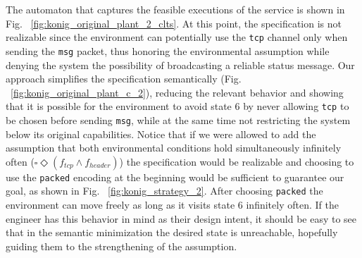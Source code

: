 The automaton that captures the feasible executions of the service is shown in Fig. ~\ref{fig:konig_original_plant_2_clts}. At this point, the specification is not realizable since the environment can potentially use the \texttt{tcp} channel only when sending the \texttt{msg} packet, thus honoring the environmental assumption while denying the system the possibility of broadcasting a reliable status message.
Our approach simplifies the specification semantically (Fig. ~\ref{fig:konig_original_plant_c_2}), reducing the relevant behavior and showing that it is possible for the environment to avoid state 6 by never allowing \texttt{tcp} to be chosen before sending \texttt{msg}, while at the same time not restricting the system below its original capabilities.
Notice that if we were allowed to add the assumption that both environmental conditions hold simultaneously infinitely often ($\square \Diamond (f_{tcp} \wedge f_{header})$) the specification would be realizable and choosing to use the \texttt{packed} encoding at the beginning would be sufficient to guarantee our goal, as shown in Fig. ~\ref{fig:konig_strategy_2}. After choosing \texttt{packed} the environment can move freely as long as it visits state 6 infinitely often. If the engineer has this behavior in mind as their design intent, it should be easy to see that in the semantic minimization the desired state is unreachable, hopefully guiding them to the strengthening of the assumption. 


